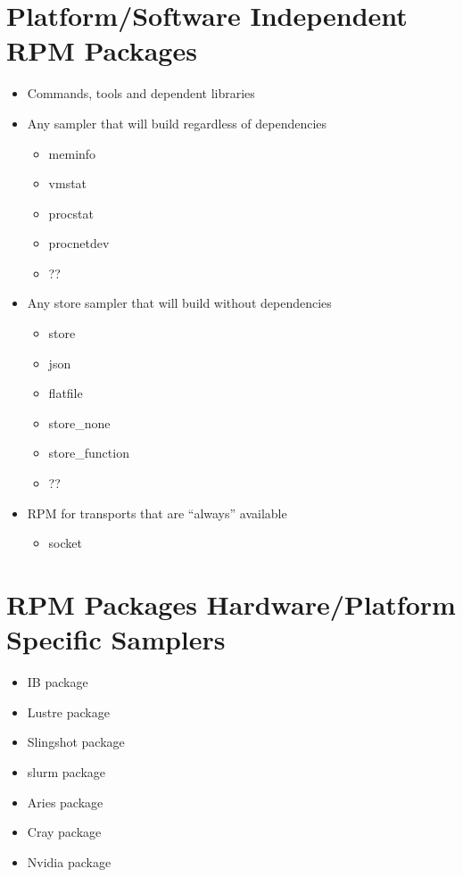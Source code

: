 \documentclass{article}
\begin{document}
    \section{Platform/Software Independent RPM Packages}
        \begin{itemize}
            \item Commands, tools and dependent libraries
            \item Any sampler that will build regardless of dependencies
                \begin{itemize}
                    \item meminfo
                    \item vmstat
                    \item procstat
                    \item procnetdev
                    \item ??
                \end{itemize}
            \item Any store sampler that will build without dependencies
               \begin{itemize}
                    \item store
                    \item json
                    \item flatfile
                    \item store\_none
                    \item store\_function
                    \item ??
                \end{itemize}
            \item RPM for transports that are “always” available
                \begin{itemize}
                    \item socket
                \end{itemize}
        \end{itemize}
    \section{RPM Packages Hardware/Platform Specific Samplers}
        \begin{itemize}
            \item IB package
            \item Lustre package
            \item Slingshot package
            \item slurm package
            \item Aries package
            \item Cray package
            \item Nvidia package
        \end{itemize}
\end{document}
